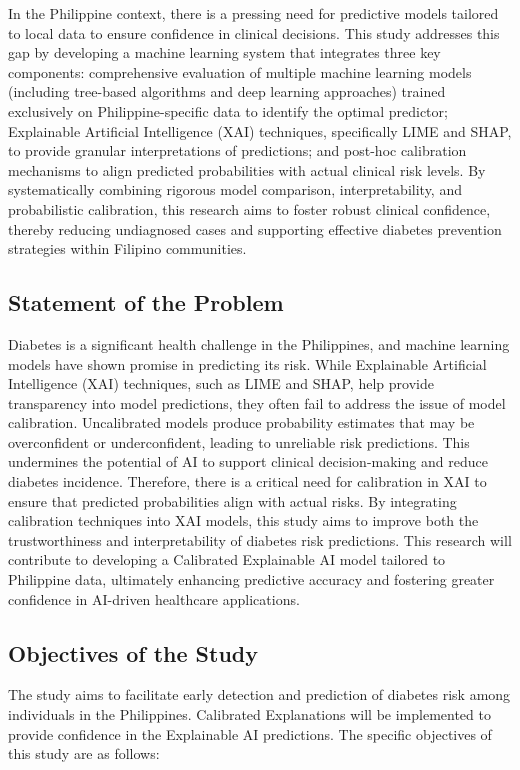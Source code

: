 In the Philippine context, there is a pressing need for predictive models tailored to local data to ensure confidence in clinical decisions. This study addresses this gap by developing a machine learning system that integrates three key components: comprehensive evaluation of multiple machine learning models (including tree-based algorithms and deep learning approaches) trained exclusively on Philippine-specific data to identify the optimal predictor; Explainable Artificial Intelligence (XAI) techniques, specifically LIME and SHAP, to provide granular interpretations of predictions; and post-hoc calibration mechanisms to align predicted probabilities with actual clinical risk levels. By systematically combining rigorous model comparison, interpretability, and probabilistic calibration, this research aims to foster robust clinical confidence, thereby reducing undiagnosed cases and supporting effective diabetes prevention strategies within Filipino communities.


\subsection{Statement of the Problem}
Diabetes is a significant health challenge in the Philippines, and machine learning models have shown promise in predicting its risk. While Explainable Artificial Intelligence (XAI) techniques, such as LIME and SHAP, help provide transparency into model predictions, they often fail to address the issue of model calibration. Uncalibrated models produce probability estimates that may be overconfident or underconfident, leading to unreliable risk predictions. This undermines the potential of AI to support clinical decision-making and reduce diabetes incidence. Therefore, there is a critical need for calibration in XAI to ensure that predicted probabilities align with actual risks. By integrating calibration techniques into XAI models, this study aims to improve both the trustworthiness and interpretability of diabetes risk predictions. This research will contribute to developing a Calibrated Explainable AI model tailored to Philippine data, ultimately enhancing predictive accuracy and fostering greater confidence in AI-driven healthcare applications.

\subsection{Objectives of the Study}

 The study aims to facilitate early detection and prediction of diabetes risk among individuals in the Philippines. Calibrated Explanations will be implemented to provide confidence in the Explainable AI predictions. The specific objectives of this study are as follows:

